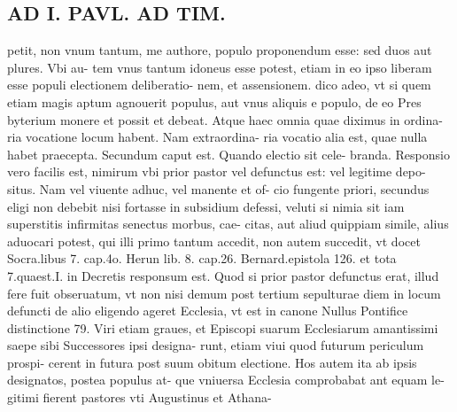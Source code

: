 \documentclass{article}
\begin{document}
\begin{pages}
\section*{AD I. PAVL. AD TIM. }\pstart petit, non vnum tantum, me authore, populo proponendum esse: sed duos aut plures. Vbi au- tem vnus tantum idoneus esse potest, etiam in eo ipso liberam esse populi electionem deliberatio- nem, et assensionem. dico adeo, vt si quem etiam magis aptum agnouerit populus, aut vnus aliquis e populo, de eo Pres byterium monere et possit et debeat. Atque haec omnia quae diximus in ordina- ria vocatione locum habent. Nam extraordina- ria vocatio alia est, quae nulla habet praecepta. Secundum caput est. Quando electio sit cele- branda. Responsio vero facilis est, nimirum vbi prior pastor vel defunctus est: vel legitime depo- situs. Nam vel viuente adhuc, vel manente et of- cio fungente priori, secundus eligi non debebit nisi fortasse in subsidium defessi, veluti si nimia sit iam superstitis infirmitas senectus morbus, cae- citas, aut aliud quippiam simile, alius aduocari potest, qui illi primo tantum accedit, non autem succedit, vt docet Socra.libus 7. cap.4o. Herun lib.  8. cap.26. Bernard.epistola 126. et tota 7.quaest.I. in Decretis responsum est. Quod si prior pastor defunctus erat, illud fere fuit obseruatum, vt non nisi demum post tertium sepulturae diem in locum defuncti de alio eligendo ageret Ecclesia, vt est in canone Nullus Pontifice distinctione 79. Viri etiam graues, et Episcopi suarum Ecclesiarum amantissimi saepe sibi Successores ipsi designa- runt, etiam viui quod futurum periculum prospi- cerent in futura post suum obitum electione. Hos autem ita ab ipsis designatos, postea populus at- que vniuersa Ecclesia comprobabat ant equam le- gitimi fierent pastores vti Augustinus et Athana-  \pend

\end{pages}
\end{document}

